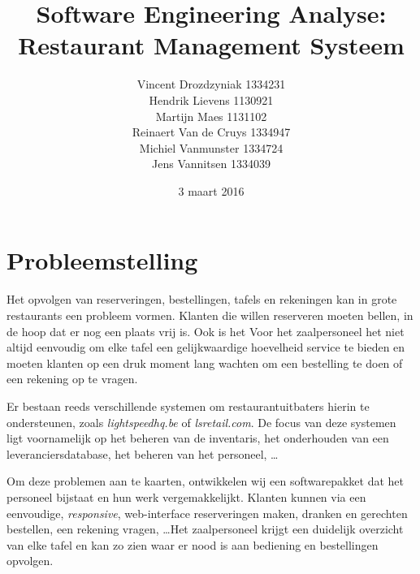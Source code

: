 \documentclass[a4paper]{article}
\title{Software Engineering Analyse: \\ Restaurant Management Systeem}
\author{Vincent Drozdzyniak 1334231 \\ Hendrik Lievens 1130921 \\ Martijn Maes 1131102 \\ Reinaert Van de Cruys 1334947 \\ Michiel Vanmunster 1334724 \\ Jens Vannitsen 1334039}
\date{3 maart 2016}
\begin{document}
\maketitle


\section{Probleemstelling}
Het opvolgen van reserveringen, bestellingen, tafels en rekeningen kan in grote restaurants een probleem vormen. Klanten die willen reserveren moeten bellen, in de hoop dat er nog een plaats vrij is. Ook is het Voor het zaalpersoneel het niet altijd eenvoudig om elke tafel een gelijkwaardige hoevelheid service te bieden en moeten klanten op een druk moment lang wachten om een bestelling te doen of een rekening op te vragen.

Er bestaan reeds verschillende systemen om restaurantuitbaters hierin te ondersteunen, zoals  \textit{lightspeedhq.be} of \textit{lsretail.com}. De focus van deze systemen ligt voornamelijk op het beheren van de inventaris, het onderhouden van een leveranciersdatabase, het beheren van het personeel, \dots

Om deze problemen aan te kaarten, ontwikkelen wij een softwarepakket dat het personeel bijstaat en hun werk vergemakkelijkt. Klanten kunnen via een eenvoudige, \textit{responsive}, web-interface reserveringen maken, dranken en gerechten bestellen, een rekening vragen, \dots Het zaalpersoneel krijgt een duidelijk overzicht van elke tafel en kan zo zien waar er nood is aan bediening en bestellingen opvolgen. 

\clearpage
\end{document}
